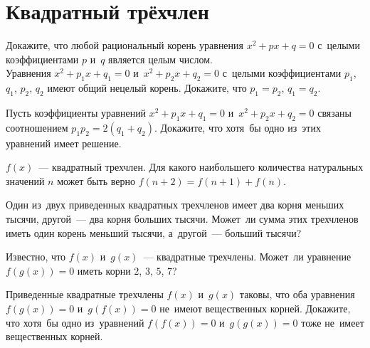 

\section*{Квадратный трёхчлен}


\begin{problems}

\item
\sbp
Докажите, что любой рациональный корень уравнения $x^2 + p x + q = 0$ с~целыми
коэффициентами $p$ и~$q$ является целым числом.
\\
\sbp
Уравнения $x^2 + p_1 x + q_1 = 0$ и~$x^2 + p_2 x + q_2 = 0$ с~целыми
коэффициентами $p_1$, $q_1$, $p_2$, $q_2$ имеют общий нецелый корень.
Докажите, что $p_1 = p_2$, $q_1 = q_2$.

\item
Пусть коэффициенты уравнений $x^2 + p_1 x + q_1 = 0$ и~$x^2 + p_2 x + q_2 = 0$
связаны соотношением $p_1 p_2 = 2 (q_1 + q_2)$.
Докажите, что хотя~бы одно из~этих уравнений имеет решение.

\item
$f(x)$~--- квадратный трехчлен.
Для какого наибольшего количества натуральных значений $n$ может быть верно
$f(n + 2) = f(n + 1) + f(n)$.

\item
Один из~двух приведенных квадратных трехчленов имеет два корня меньших тысячи,
другой~--- два корня больших тысячи.
Может~ли сумма этих трехчленов иметь один корень меньший тысячи, а~другой~---
больший тысячи?

\item
Известно, что $f(x)$ и~$g(x)$~--- квадратные трехчлены.
Может~ли уравнение $f(g(x)) = 0$ иметь корни $2$, $3$, $5$, $7$?

\item
Приведенные квадратные трехчлены $f(x)$ и~$g(x)$ таковы, что оба уравнения
$f(g(x)) = 0$ и~$g(f(x)) = 0$ не~имеют вещественных корней.
Докажите, что хотя~бы одно из~уравнений $f(f(x)) = 0$ и~$g(g(x)) = 0$ тоже
не~имеет вещественных корней.

\end{problems}


